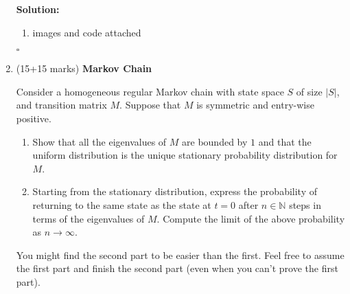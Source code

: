 \documentclass[10pt]{article}
\newcommand{\abs}[1]{{\lvert #1\rvert}}
\newenvironment{solution}{\textbf{Solution:}}{\hfill$\square$}
\begin{document}
\begin{enumerate}
\begin{solution}
\begin{enumerate}
\item images and code attached
\end{enumerate}
\end{solution}

\vspace{.1in}





\item (15+15 marks) \textbf{Markov Chain}

Consider a homogeneous regular Markov chain with state space $S$ of size $\abs{S}$, and transition matrix $M$. Suppose that $M$ is symmetric and entry-wise positive.
\begin{enumerate}
\item Show that all the eigenvalues of $M$ are bounded by $1$ and that the uniform distribution
is the unique stationary probability distribution for $M$.
\item Starting from the stationary distribution, express the probability of returning to the same state as the state at $t=0$ after  $n \in \mathbb{N}$ steps in terms of the eigenvalues of $M$. Compute the limit of the above probability as $n \rightarrow \infty$.


\end{enumerate}

You might find the second part to be easier than the first. Feel free to assume the first part and finish the second part (even when you can't prove the first part).


\end{enumerate}
\end{document}
